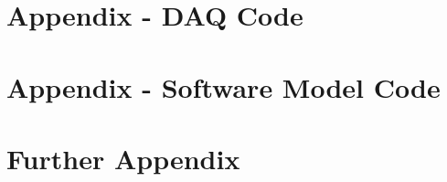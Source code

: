 \documentclass[12pt,a4paper]{scrreprt}
\begin{document}
\onehalfspacing

\begin{titlepage}
    \maketitle
    \thispagestyle{empty}
\end{titlepage}

\tableofcontents
\thispagestyle{empty}
\clearpage

\listoffigures
\thispagestyle{empty}

\listofequations


\clearpage














\appendix
\chapter{Appendix - DAQ Code}


\chapter{Appendix - Software Model Code}


\chapter{Further Appendix}

\end{document}
